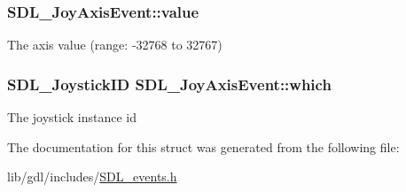 \subsubsection[{value}]{ S\+D\+L\+\_\+\+Joy\+Axis\+Event\+::value}\label{struct_s_d_l___joy_axis_event_a53ee73e7c367934dd6edb69963be5556}
The axis value (range\+: -\/32768 to 32767) \hypertarget{struct_s_d_l___joy_axis_event_a965719f4703a7091bcc5f07f79fcf7e1}{}
\subsubsection[{which}]{\setlength{\rightskip}{0pt plus 5cm}S\+D\+L\+\_\+\+Joystick\+I\+D S\+D\+L\+\_\+\+Joy\+Axis\+Event\+::which}\label{struct_s_d_l___joy_axis_event_a965719f4703a7091bcc5f07f79fcf7e1}
The joystick instance id 

The documentation for this struct was generated from the following file\+:\begin{DoxyCompactItemize}
\item 
lib/gdl/includes/\hyperlink{_s_d_l__events_8h}{S\+D\+L\+\_\+events.\+h}\end{DoxyCompactItemize}
